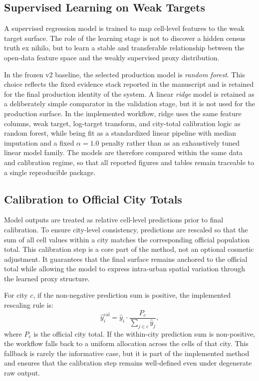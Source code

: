 \subsection{Supervised Learning on Weak Targets}

A supervised regression model is trained to map cell-level features to the weak target surface. The role of the learning stage is not to discover a hidden census truth ex nihilo, but to learn a stable and transferable relationship between the open-data feature space and the weakly supervised proxy distribution.

In the frozen v2 baseline, the selected production model is \emph{random forest}. This choice reflects the fixed evidence stack reported in the manuscript and is retained for the final production identity of the system. A linear \emph{ridge} model is retained as a deliberately simple comparator in the validation stage, but it is not used for the production surface. In the implemented workflow, ridge uses the same feature columns, weak target, log-target transform, and city-total calibration logic as random forest, while being fit as a standardized linear pipeline with median imputation and a fixed $\alpha = 1.0$ penalty rather than as an exhaustively tuned linear model family. The models are therefore compared within the same data and calibration regime, so that all reported figures and tables remain traceable to a single reproducible package.

\subsection{Calibration to Official City Totals}

Model outputs are treated as relative cell-level predictions prior to final calibration. To ensure city-level consistency, predictions are rescaled so that the sum of all cell values within a city matches the corresponding official population total. This calibration step is a core part of the method, not an optional cosmetic adjustment. It guarantees that the final surface remains anchored to the official total while allowing the model to express intra-urban spatial variation through the learned proxy structure.

For city $c$, if the non-negative prediction sum is positive, the implemented rescaling rule is:
\[
\hat{y}_i^{\mathrm{cal}} = \hat{y}_i \cdot \frac{P_c}{\sum_{j \in c} \hat{y}_j},
\]
where $P_c$ is the official city total. If the within-city prediction sum is non-positive, the workflow falls back to a uniform allocation across the cells of that city. This fallback is rarely the informative case, but it is part of the implemented method and ensures that the calibration step remains well-defined even under degenerate raw output.

